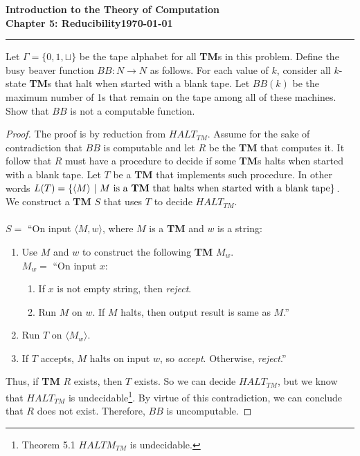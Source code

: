 \documentclass[11pt]{article}
\newcommand{\dated}{\today}
\begin{document}
\textbf{Introduction to the Theory of
Computation}\hfill\textbf{\myname}\\[0.01in]
\textbf{Chapter 5: Reducibility}\hfill\textbf{\dated}\\
\smallskip\hrule\bigskip

\begin{problem}{5.16}
Let $\Gamma = \{0, 1, \sqcup\}$ be the tape alphabet for all \textbf{TM}s in this problem. Define the busy beaver function $BB: N \longrightarrow N$ as follows. For each value of $k$, consider all $k$-state \textbf{TM}s that halt when started with a blank tape. Let $BB(k)$ be the maximum number of 1s that remain on the tape among all of these machines. Show that $BB$ is not a computable function.
\end{problem}

\begin{proof}
The proof is by reduction from $HALT_{TM}$. Assume for the sake of contradiction that $BB$ is computable and let $R$ be the \textbf{TM} that computes it. It follow that $R$ must have a procedure to decide if some 
\textbf{TM}s halts when started with a blank tape. Let $T$ be a \textbf{TM} that implements such procedure. In other words $L(T) = \{ \langle M \rangle \ | \ M \text{ is a \textbf{TM} that halts when started with a blank tape}\}$. We construct a \textbf{TM} $S$ that uses $T$ to decide $HALT_{TM}$.  \\
\\
$S =$ \textquotedblleft On input $\langle M, w \rangle$, where $M$ is a \textbf{TM} and $w$ is a string:
\begin{enumerate}
\item Use $M$ and $w$ to construct the following \textbf{TM} $M_w$. \\
$M_w =$ \textquotedblleft On input $x$:
\begin{enumerate}[1.]
\item If $x$ is not empty string, then \textit{reject}.
\item Run $M$ on $w$. If $M$ halts, then output result is same as $M$.\textquotedblright
\end{enumerate}
\item Run $T$ on $\langle M_w \rangle$.
\item If $T$ accepts, $M$ halts on input $w$, so \textit{accept}. Otherwise, \textit{reject}.\textquotedblright
\end{enumerate}
Thus, if \textbf{TM} $R$ exists, then $T$ exists. So we can decide $HALT_{TM}$, but we know that $HALT_{TM}$ is undecidable\footnote{Theorem 5.1 $HALTM_{TM}$ is undecidable.}. By virtue of this contradiction, we can conclude that $R$ does not exist. Therefore, $BB$ is uncomputable.
\end{proof}
\end{document}

